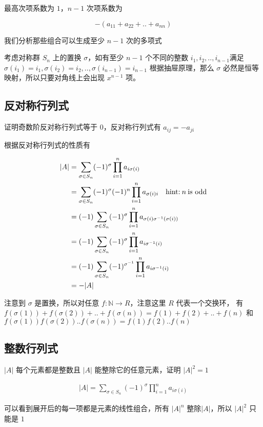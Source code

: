 \documentclass[12pt,a4paper]{ctexart}
\begin{document}
最高次项系数为 $1$，$n-1$ 次项系数为

\[
-(a_{11} + a_{22} + .. + a_{nn})
\]

我们分析那些组合可以生成至少 $n-1$ 次的多项式

考虑对称群 $S_n$ 上的置换 $\sigma$，如有至少  $n-1$ 个不同的整数 $i_1,i_2,..,i_{n-1}$满足 $\sigma(i_1) = i_1, \sigma(i_2) = i_2, .., \sigma(i_{n-1}) = i_{n-1}$
根据抽屉原理，那么 $\sigma$ 必然是恒等映射，所以只要对角线上会出现 $x^{n-1}$ 项。

\subsection{反对称行列式}

证明奇数阶反对称行列式等于 $0$，反对称行列式有 $a_{ij}= -a_{ji}$

根据反对称行列式的性质有

\begin{align*}
    |A| &= \sum_{\sigma \in S_n}(-1)^{\sigma}\prod_{i=1}^{n}a_{i \sigma(i)} \\
    &= \sum_{\sigma \in S_n}(-1)^{\sigma}(-1)^n\prod_{i=1}^{n}a_{\sigma(i)i} \quad \text{hint:\:} n \:\text{is odd} \\
    &= (-1)\sum_{\sigma \in S_n}(-1)^{\sigma}\prod_{i=1}^{n}a_{\sigma(i)\sigma^{-1}(\sigma(i))} \\
    &= (-1)\sum_{\sigma \in S_n}(-1)^{\sigma}\prod_{i=1}^{n}a_{i\sigma^{-1}(i)} \\
    &= (-1)\sum_{\sigma \in S_n}(-1)^{\sigma^{-1}}\prod_{i=1}^{n}a_{i\sigma^{-1}(i)} \\ 
    &= - |A|
\end{align*}

注意到 $\sigma$ 是置换，所以对任意  $f: \mathbb{N} \to R$，注意这里 $R$ 代表一个交换环， 有 $f(\sigma(1)) + f(\sigma(2)) + .. + f(\sigma(n)) = f(1) + f(2) + .. + f(n)$
和 $f(\sigma(1))f(\sigma(2))..f(\sigma(n)) = f(1)f(2)..f(n)$

\subsection{整数行列式}

$|A|$ 每个元素都是整数且 $|A|$ 能整除它的任意元素，证明 $|A|^2 =1 $

\begin{align*}
    |A| = \sum_{\sigma \in S_n}(-1)^{\sigma}\prod_{i=1}^{n}a_{i \sigma(i)}
\end{align*}

可以看到展开后的每一项都是元素的线性组合，所有 $|A|^n$ 整除$ |A|$，所以 $|A|^2$ 只能是 $1$
\end{document}
